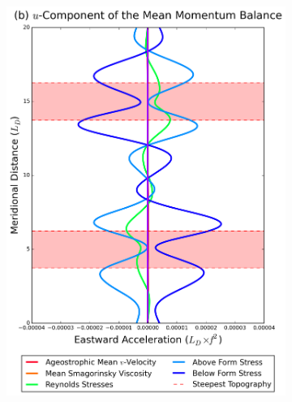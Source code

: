 \documentclass[12pt,a4paper]{report}
\begin{document}
\begin{figure}
\begin{subfigure}{0.46\linewidth}
 		\includegraphics[width=\linewidth ]{umom_2}
 		\label{fig:umomlayer2}
 	\end{subfigure}
 	\begin{subfigure}{0.46\linewidth}
 		\centering

\end{subfigure}
\end{figure}
\end{document}
